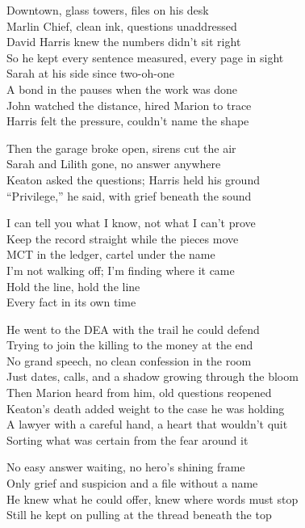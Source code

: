 \begin{lyrics}
Downtown, glass towers, files on his desk\\
Marlin Chief, clean ink, questions unaddressed\\
David Harris knew the numbers didn’t sit right\\
So he kept every sentence measured, every page in sight\\
Sarah at his side since two-oh-one\\
A bond in the pauses when the work was done\\
John watched the distance, hired Marion to trace\\
Harris felt the pressure, couldn’t name the shape

Then the garage broke open, sirens cut the air\\
Sarah and Lilith gone, no answer anywhere\\
Keaton asked the questions; Harris held his ground\\
“Privilege,” he said, with grief beneath the sound

I can tell you what I know, not what I can’t prove\\
Keep the record straight while the pieces move\\
MCT in the ledger, cartel under the name\\
I’m not walking off; I’m finding where it came\\
Hold the line, hold the line\\
Every fact in its own time

He went to the DEA with the trail he could defend\\
Trying to join the killing to the money at the end\\
No grand speech, no clean confession in the room\\
Just dates, calls, and a shadow growing through the bloom\\
Then Marion heard from him, old questions reopened\\
Keaton’s death added weight to the case he was holding\\
A lawyer with a careful hand, a heart that wouldn’t quit\\
Sorting what was certain from the fear around it

No easy answer waiting, no hero’s shining frame\\
Only grief and suspicion and a file without a name\\
He knew what he could offer, knew where words must stop\\
Still he kept on pulling at the thread beneath the top


\end{lyrics}
